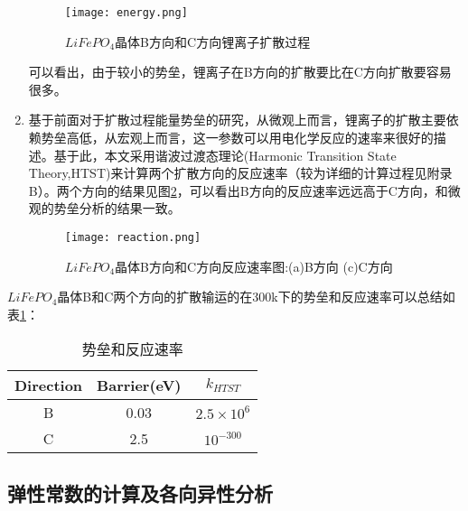 \begin{enumerate}
	\begin{figure}
	\centering   
	\texttt{[image: energy.png]}
	\caption{$LiFePO_4$晶体B方向和C方向锂离子扩散过程} 
	\label{fig:energy}
	\end{figure}
	可以看出，由于较小的势垒，锂离子在B方向的扩散要比在C方向扩散要容易很多。
	\item 基于前面对于扩散过程能量势垒的研究，从微观上而言，锂离子的扩散主要依赖势垒高低，从宏观上而言，这一参数可以用电化学反应的速率来很好的描述。基于此，本文采用谐波过渡态理论(Harmonic Transition State Theory,HTST)来计算两个扩散方向的反应速率\cite{Vineyard1957Frequency,Eyring1935The,Voter1984Transition}（较为详细的计算过程见附录B）。两个方向的结果见图\ref{fig:reaction}，可以看出B方向的反应速率远远高于C方向，和微观的势垒分析的结果一致。
	\begin{figure}
	\centering   
	\texttt{[image: reaction.png]}
	\caption{$LiFePO_4$晶体B方向和C方向反应速率图:(a)B方向 (c)C方向} 
	\label{fig:reaction}
	\end{figure}
\end{enumerate}
$LiFePO_4$晶体B和C两个方向的扩散输运的在300k下的势垒和反应速率可以总结如表\ref{tab:HTST}：
\begin{table}[!htbp]
\centering
\caption{势垒和反应速率}\label{tab:HTST}%
\begin{tabular}{ccc}
\toprule
Direction & Barrier(eV) & $k_{HTST}$\\
\midrule
B & 0.03 & $2.5 \times 10^6$\\
C & 2.5 & $10^{-300}$ \\
\bottomrule
\end{tabular}
\end{table}

\subsection{弹性常数的计算及各向异性分析}
